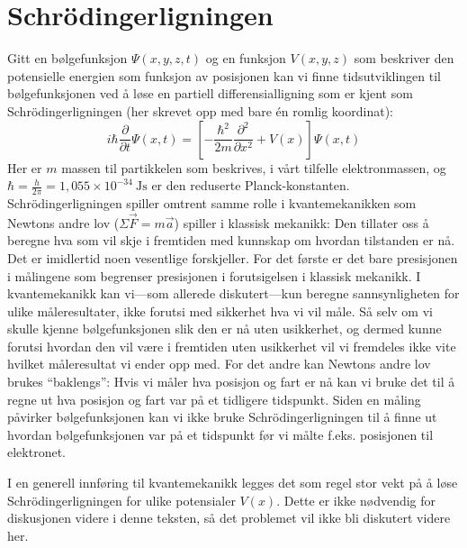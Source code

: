 \section{Schr{\"o}dingerligningen}
Gitt en bølgefunksjon $\Psi(x,y,z,t)$ og en funksjon $V(x,y,z)$ som beskriver den potensielle energien som funksjon av posisjonen kan vi finne tidsutviklingen til bølgefunksjonen ved å løse en partiell differensialligning som er kjent som Schr{\"o}dingerligningen (her skrevet opp med bare \'en romlig koordinat):
\begin{displaymath}
	i\hbar\frac{\partial}{\partial t}\Psi(x,t) = \left[ - \frac{\hbar^2}{2m}\frac{\partial^2}{\partial x^2} + V(x)\right]\Psi(x,t)
\end{displaymath}
Her er $m$ massen til partikkelen som beskrives, i vårt tilfelle elektronmassen, og $\hbar = \frac{h}{2\pi} = 1,055\times10^{-34}~\mathrm{Js}$ er den reduserte Planck-konstanten. Schr{\"o}dingerligningen spiller omtrent samme rolle i kvantemekanikken som Newtons andre lov ($\Sigma \vec{F} = m\vec{a}$) spiller i klassisk mekanikk: Den tillater oss å beregne hva som vil skje i fremtiden med kunnskap om hvordan tilstanden er nå. Det er imidlertid noen vesentlige forskjeller. For det første er det bare presisjonen i målingene som begrenser presisjonen i forutsigelsen i klassisk mekanikk. I kvantemekanikk kan vi---som allerede diskutert---kun beregne sannsynligheten for ulike måleresultater, ikke forutsi med sikkerhet hva vi vil måle. Så selv om vi skulle kjenne bølgefunksjonen slik den er nå uten usikkerhet, og dermed kunne forutsi hvordan den vil være i fremtiden uten usikkerhet vil vi fremdeles ikke vite hvilket måleresultat vi ender opp med. For det andre kan Newtons andre lov brukes ``baklengs'': Hvis vi måler hva posisjon og fart er nå kan vi bruke det til å regne ut hva posisjon og fart var på et tidligere tidspunkt. Siden en måling påvirker bølgefunksjonen kan vi ikke bruke Schr{\"o}dingerligningen til å finne ut hvordan bølgefunksjonen var på et tidspunkt før vi målte f.eks. posisjonen til elektronet.

I en generell innføring til kvantemekanikk legges det som regel stor vekt på å løse Schr{\"o}dingerligningen for ulike potensialer $V(x)$. Dette er ikke nødvendig for diskusjonen videre i denne teksten, så det problemet vil ikke bli diskutert videre her.

